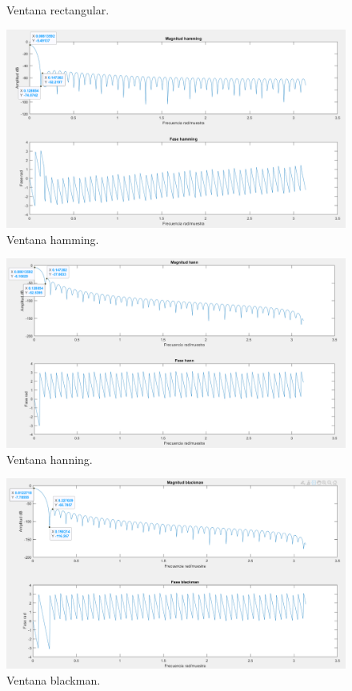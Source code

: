 \documentclass[letterpaper,onecolumn,10pt,journal,final]{IEEEtran}
\begin{document}
\begin{enumerate}[1)]
\begin{figure}[H]
        \caption{Ventana rectangular.}
        \label{fig:II_2)rect}
    \end{figure}
    \begin{figure}[H]
        \centering
        \includegraphics[width=0.75 \linewidth]{Figuras/II_2)hamming_dB.png}
        \caption{Ventana hamming.}
        \label{fig:II_2)ham}
    \end{figure}
    \begin{figure}[H]
        \centering
        \includegraphics[width=0.75 \linewidth]{Figuras/II_2)hann_dB.png}
        \caption{Ventana hanning.}
        \label{fig:II_2)han}
    \end{figure}
    \begin{figure}[H]
        \centering
        \includegraphics[width=0.75 \linewidth]{Figuras/II_2)blackman_dB.png}
        \caption{Ventana blackman.}
        \label{fig:II_2)blackman}

\end{figure}
\end{enumerate}
\end{document}
